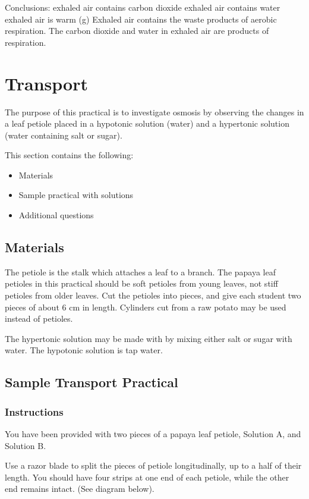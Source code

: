 \begin{enumerate}
Conclusions:
exhaled air contains carbon dioxide
exhaled air contains water
exhaled air is warm
	(g) Exhaled air contains the waste products of aerobic respiration. The carbon dioxide and 
	  water in exhaled air are products of respiration.

\section{Transport}

The purpose of this practical is to investigate osmosis by observing the changes in a leaf petiole placed in a hypotonic solution (water) and a hypertonic solution (water containing salt or sugar). 

This section contains the following:
\begin{itemize}
\item{Materials}
\item{Sample practical with solutions}
\item{Additional questions}
\end{itemize}

\subsection{Materials}
The petiole is the stalk which attaches a leaf to a branch. The papaya leaf petioles in this practical should be soft petioles from young leaves, not stiff petioles from older leaves. Cut the petioles into pieces, and give each student two pieces of about 6 cm in length. Cylinders cut from a raw potato  may be used instead of petioles.

The hypertonic solution may be made with by mixing either salt or sugar with water. The hypotonic solution is tap water.

\subsection{Sample Transport Practical}

\subsubsection{Instructions}

You have been provided with two pieces of a papaya leaf petiole, Solution A, and Solution B.
 
Use a razor blade to split the pieces of petiole longitudinally, up to a half of their length.  You should have four strips at one end of each petiole, while the other end remains intact. 
      (See diagram below).


\end{enumerate}
